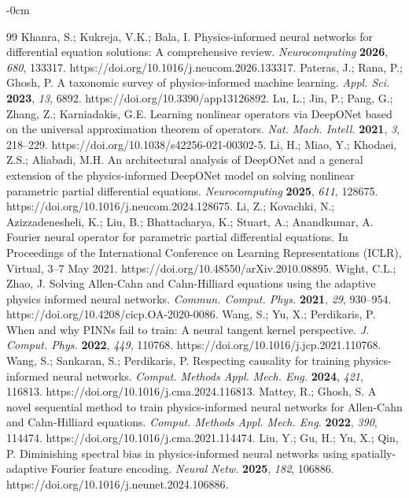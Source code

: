 \documentclass[symmetry,article,submit,moreauthors]{Definitions/mdpi}
\begin{document}
\begin{adjustwidth}{-\extralength}{0cm}
\begin{thebibliography}{99}
 Khanra, S.; Kukreja, V.K.; Bala, I. Physics-informed neural networks for differential equation solutions: A comprehensive review. \textit{Neurocomputing} \textbf{2026}, \textit{680}, 133317. https://doi.org/10.1016/j.neucom.2026.133317.
 Pateras, J.; Rana, P.; Ghosh, P. A taxonomic survey of physics-informed machine learning. \textit{Appl. Sci.} \textbf{2023}, \textit{13}, 6892. https://doi.org/10.3390/app13126892.
 Lu, L.; Jin, P.; Pang, G.; Zhang, Z.; Karniadakis, G.E. Learning nonlinear operators via DeepONet based on the universal approximation theorem of operators. \textit{Nat. Mach. Intell.} \textbf{2021}, \textit{3}, 218--229. https://doi.org/10.1038/s42256-021-00302-5.
 Li, H.; Miao, Y.; Khodaei, Z.S.; Aliabadi, M.H. An architectural analysis of DeepONet and a general extension of the physics-informed DeepONet model on solving nonlinear parametric partial differential equations. \textit{Neurocomputing} \textbf{2025}, \textit{611}, 128675. https://doi.org/10.1016/j.neucom.2024.128675.
 Li, Z.; Kovachki, N.; Azizzadenesheli, K.; Liu, B.; Bhattacharya, K.; Stuart, A.; Anandkumar, A. Fourier neural operator for parametric partial differential equations. In Proceedings of the International Conference on Learning Representations (ICLR), Virtual, 3--7 May 2021. https://doi.org/10.48550/arXiv.2010.08895.
 Wight, C.L.; Zhao, J. Solving Allen-Cahn and Cahn-Hilliard equations using the adaptive physics informed neural networks. \textit{Commun. Comput. Phys.} \textbf{2021}, \textit{29}, 930--954. https://doi.org/10.4208/cicp.OA-2020-0086.
 Wang, S.; Yu, X.; Perdikaris, P. When and why PINNs fail to train: A neural tangent kernel perspective. \textit{J. Comput. Phys.} \textbf{2022}, \textit{449}, 110768. https://doi.org/10.1016/j.jcp.2021.110768.
 Wang, S.; Sankaran, S.; Perdikaris, P. Respecting causality for training physics-informed neural networks. \textit{Comput. Methods Appl. Mech. Eng.} \textbf{2024}, \textit{421}, 116813. https://doi.org/10.1016/j.cma.2024.116813.
 Mattey, R.; Ghosh, S. A novel sequential method to train physics-informed neural networks for Allen-Cahn and Cahn-Hilliard equations. \textit{Comput. Methods Appl. Mech. Eng.} \textbf{2022}, \textit{390}, 114474. https://doi.org/10.1016/j.cma.2021.114474.
 Liu, Y.; Gu, H.; Yu, X.; Qin, P. Diminishing spectral bias in physics-informed neural networks using spatially-adaptive Fourier feature encoding. \textit{Neural Netw.} \textbf{2025}, \textit{182}, 106886. https://doi.org/10.1016/j.neunet.2024.106886.

\end{thebibliography}
\end{adjustwidth}
\end{document}

